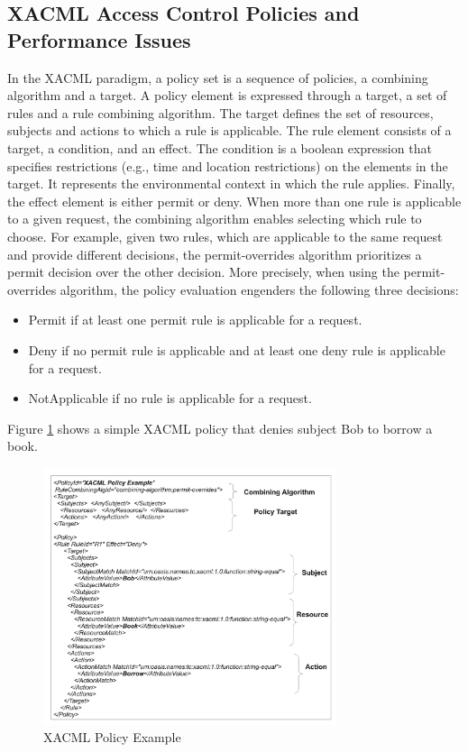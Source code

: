 \subsection{XACML Access Control Policies and Performance Issues}
In the XACML paradigm, a policy set is a sequence of policies, a combining algorithm and
 a target. A policy element is expressed through a target, a set of rules and a rule combining algorithm. 
The target defines the set of resources, subjects and actions to which a rule is applicable. The rule element consists of a 
target, a condition, and an effect. The condition is a boolean expression that specifies restrictions (e.g., time and location restrictions) on the elements in the target. It represents 
the environmental context in which the rule applies. Finally, the effect element is either permit or deny. 
When more than one rule is applicable to a given request, the combining algorithm enables selecting which rule to choose.
For example, given two rules, which are applicable to the same request and provide different decisions,
the permit-overrides algorithm prioritizes a permit decision over the other decision.
More precisely, when using the permit-overrides algorithm, the policy evaluation engenders the following three decisions: 
\begin{itemize}
\item Permit if at least one permit rule is applicable for a request.
\item Deny if no permit rule is applicable and at least one deny rule is applicable for a request.
\item NotApplicable if no rule is applicable for a request.
\end{itemize}

Figure \ref{figur1} shows a simple XACML policy that denies subject Bob to borrow a book.
\fontsize{5}{5}
\begin{figure}[!h]
\begin{center}
\includegraphics[width=8.6cm]{xacml}
\caption{XACML Policy Example}
\label{figur1}
\end{center}
\end{figure}

